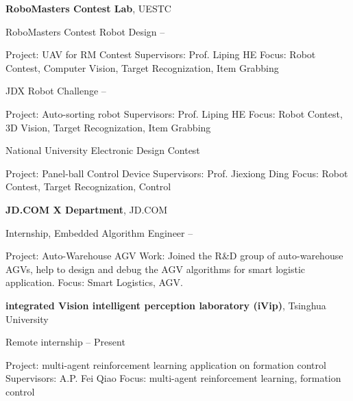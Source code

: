 \documentclass[letterpaper,MMMyyyy,nonstopmode]{simpleresumecv}
\begin{document}
\begin{Body}
\Gap
\Entry
{\textbf{RoboMasters Contest Lab}},
UESTC

\Gap
\BulletItem
RoboMasters Contest Robot Design
\hfill
{} --
\begin{Detail}
	\SubBulletItem
	Project:
	UAV for RM Contest
	\SubBulletItem
	Supervisors:
	Prof. Liping HE
	\SubBulletItem
	Focus:
	Robot Contest, Computer Vision, Target Recognization, Item Grabbing
\end{Detail}

\Gap
\BulletItem
JDX Robot Challenge
\hfill
{} --
\begin{Detail}
	\SubBulletItem
	Project:
	Auto-sorting robot
	\SubBulletItem
	Supervisors:
	Prof. Liping HE
	\SubBulletItem
	Focus:
	Robot Contest, 3D Vision, Target Recognization, Item Grabbing
\end{Detail}

\Gap
\BulletItem
National University Electronic Design Contest
\hfill
{} 
\begin{Detail}
	\SubBulletItem
	Project:
	Panel-ball Control Device
	\SubBulletItem
	Supervisors:
	Prof. Jiexiong Ding
	\SubBulletItem
	Focus:
	Robot Contest, Target Recognization, Control
\end{Detail}

\Gap
\Entry
{\textbf{JD.COM X Department}}, JD.COM

\Gap
\BulletItem
Internship, Embedded Algorithm Engineer
\hfill
{} --
\begin{Detail}
	\SubBulletItem
	Project:
	Auto-Warehouse AGV
	\SubBulletItem
	Work: Joined the R\&D group of auto-warehouse AGVs, help to design and debug the AGV algorithms for smart logistic application.
	\SubBulletItem
	Focus:
	Smart Logistics, AGV.
\end{Detail}

\Gap
\Entry
{\textbf{integrated Vision intelligent perception laboratory (iVip)}},
Tsinghua University

\Gap
\BulletItem
Remote internship 
\hfill
{} --
Present
\begin{Detail}
\SubBulletItem
Project:
multi-agent reinforcement learning application on formation control
\SubBulletItem
Supervisors:
A.P. Fei Qiao
\SubBulletItem
Focus:
multi-agent reinforcement learning, formation control
\end{Detail}


\end{Body}
\end{document}
